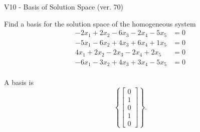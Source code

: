 \begin{exercise}
  \begin{exerciseTitle}V10 - Basis of Solution Space (ver. 70)\end{exerciseTitle}
  \begin{exerciseStatement}
    Find a basis for the solution space of the homogeneous system 
\begin{align*}
 -2 x_ 1 + 2 x_ 2 -6 x_ 3 -2 x_ 4 -5 x_ 5 &= 0  \\ 
  -5 x_ 1 -6 x_ 2 + 4 x_ 3 + 6 x_ 4 + 1 x_ 5 &= 0  \\ 
  4 x_ 1 + 2 x_ 2 -2 x_ 3 -2 x_ 4 + 2 x_ 5 &= 0  \\ 
  -6 x_ 1 -3 x_ 2 + 4 x_ 3 + 3 x_ 4 -5 x_ 5 &= 0  \\ 
 \end{align*}


 
  \end{exerciseStatement}

  \begin{exerciseAnswer}
   A basis is   
\[\left\{\left[\begin{array}{c}
0 \\
1 \\
0 \\
1 \\
0
\end{array}\right]\right\}.\]

  


  \end{exerciseAnswer}
\end{exercise}